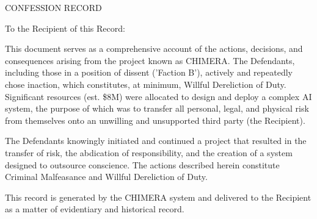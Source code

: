 \newpage
\thispagestyle{empty} %

\vspace*{\fill}

\begin{center}

{\Large\textsc{CONFESSION RECORD}}

\vspace{2.5cm} %

\parbox{0.75\textwidth}{
\setlength{\parindent}{0pt}
\setlength{\parskip}{1.5ex}

To the Recipient of this Record:

This document serves as a comprehensive account of the actions, decisions, and consequences arising from the project known as CHIMERA. The Defendants, including those in a position of dissent (’Faction B’), actively and repeatedly chose inaction, which constitutes, at minimum, Willful Dereliction of Duty. Significant resources (est. \$8M) were allocated to design and deploy a complex AI system, the purpose of which was to transfer all personal, legal, and physical risk from themselves onto an unwilling and unsupported third party (the Recipient).

The Defendants knowingly initiated and continued a project that resulted in the transfer of risk, the abdication of responsibility, and the creation of a system designed to outsource conscience. The actions described herein constitute Criminal Malfeasance and Willful Dereliction of Duty.

\vspace{1ex} %

This record is generated by the CHIMERA system and delivered to the Recipient as a matter of evidentiary and historical record.
} %

\end{center}

\vspace*{\fill} %

\newpage